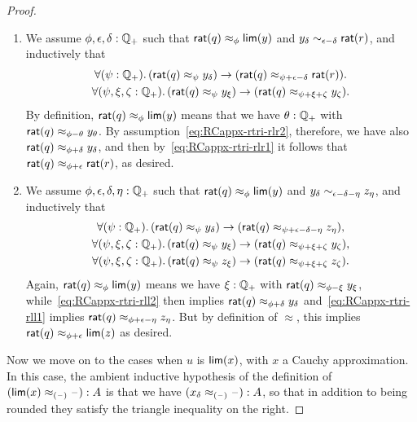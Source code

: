 \begin{proof}
\begin{enumerate}
  \item We assume $\phi,\epsilon,\delta:\mathbb{Q}_{+}$ such that $\mathsf{rat}(q)\approx_\phi \mathsf{lim}(y)$ and $y_\delta \sim_{\epsilon-\delta} \mathsf{rat}(r)$, and inductively that
    \begin{gather}
      \fall{\psi:\Qp}(\rcrat(q) \approx_{\psi} y_\delta) \to (\rcrat(q) \approx_{\psi+\epsilon-\delta} \rcrat(r)).\label{eq:RCappx-rtri-rlr1}\\
      \fall{\psi,\xi,\zeta:\Qp} (\rcrat(q) \approx_{\psi} y_\xi) \to (\rcrat(q) \approx_{\psi+\xi+\zeta} y_\zeta).\label{eq:RCappx-rtri-rlr2}
    \end{gather}
    By definition, $\mathsf{rat}(q)\approx_\phi \mathsf{lim}(y)$ means that we have $\theta:\mathbb{Q}_{+}$ with $\mathsf{rat}(q) \approx_{\phi-\theta} y_\theta$.
    By assumption~\eqref{eq:RCappx-rtri-rlr2}, therefore, we have also $\mathsf{rat}(q) \approx_{\phi+\delta} y_\delta$, and then by~\eqref{eq:RCappx-rtri-rlr1} it follows that $\mathsf{rat}(q) \approx_{\phi+\epsilon} \mathsf{rat}(r)$, as desired.
  \item We assume $\phi,\epsilon,\delta,\eta:\mathbb{Q}_{+}$ such that $\mathsf{rat}(q)\approx_\phi \mathsf{lim}(y)$ and $y_\delta \sim_{\epsilon-\delta-\eta} z_\eta$, and inductively that
    \begin{gather}
      \fall{\psi:\Qp}(\rcrat(q) \approx_{\psi} y_\delta) \to (\rcrat(q) \approx_{\psi+\epsilon-\delta-\eta} z_\eta), \label{eq:RCappx-rtri-rll1}\\
      \fall{\psi,\xi,\zeta:\Qp} (\rcrat(q) \approx_{\psi} y_\xi) \to (\rcrat(q) \approx_{\psi+\xi+\zeta} y_\zeta), \label{eq:RCappx-rtri-rll2}\\
      \fall{\psi,\xi,\zeta:\Qp} (\rcrat(q) \approx_{\psi} z_\xi) \to (\rcrat(q) \approx_{\psi+\xi+\zeta} z_\zeta). \label{eq:RCappx-rtri-rll3}
    \end{gather}
    Again, $\mathsf{rat}(q)\approx_\phi \mathsf{lim}(y)$ means we have $\xi:\mathbb{Q}_{+}$ with $\mathsf{rat}(q) \approx_{\phi-\xi} y_\xi$, while~\eqref{eq:RCappx-rtri-rll2} then implies $\mathsf{rat}(q) \approx_{\phi+\delta} y_\delta$ and~\eqref{eq:RCappx-rtri-rll1} implies $\mathsf{rat}(q) \approx_{\phi+\epsilon-\eta} z_\eta$.
    But by definition of $\approx$, this implies $\mathsf{rat}(q) \approx_{\phi+\epsilon} \mathsf{lim}(z)$ as desired.
  \end{enumerate}
  Now we move on to the cases when $u$ is $\mathsf{lim}(x)$, with $x$ a Cauchy approximation.
  In this case, the ambient inductive hypothesis of the definition of $(\mathsf{lim}(x) \approx_{(\mathord{\hspace{1pt}\text{--}\hspace{1pt}})} {\mathord{\hspace{1pt}\text{--}\hspace{1pt}}}) : A$ is that we have ${(x_\delta \approx_{(\mathord{\hspace{1pt}\text{--}\hspace{1pt}})} {\mathord{\hspace{1pt}\text{--}\hspace{1pt}}})}: A$, so that in addition to being rounded they satisfy the triangle inequality on the right.

\end{proof}
